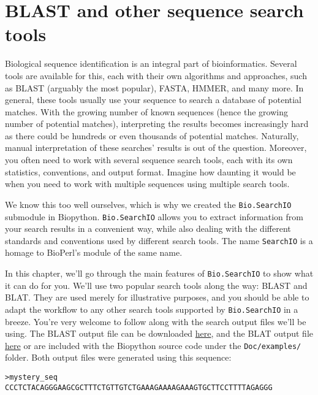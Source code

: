 \chapter{BLAST and other sequence search tools}
\label{chapter:searchio}

Biological sequence identification is an integral part of bioinformatics.
Several tools are available for this, each with their own algorithms and
approaches, such as BLAST (arguably the most popular), FASTA, HMMER, and many
more. In general, these tools usually use your sequence to search a database of
potential matches. With the growing number of known sequences (hence the
growing number of potential matches), interpreting the results becomes
increasingly hard as there could be hundreds or even thousands of potential
matches. Naturally, manual interpretation of these searches' results is out of
the question. Moreover, you often need to work with several sequence search
tools, each with its own statistics, conventions, and output format. Imagine how
daunting it would be when you need to work with multiple sequences using
multiple search tools.

We know this too well ourselves, which is why we created the \verb|Bio.SearchIO|
submodule in Biopython. \verb|Bio.SearchIO| allows you to extract information
from your search results in a convenient way, while also dealing with the
different standards and conventions used by different search tools.
The name \verb|SearchIO| is a homage to BioPerl's module of the same name.

In this chapter, we'll go through the main features of \verb|Bio.SearchIO| to
show what it can do for you. We'll use two popular search tools along the way:
BLAST and BLAT. They are used merely for illustrative purposes, and you should
be able to adapt the workflow to any other search tools supported by
\verb|Bio.SearchIO| in a breeze. You're very welcome to follow along with the
search output files we'll be using. The BLAST output file can be downloaded
\href{https://github.com/biopython/biopython/blob/master/Doc/examples/my_blast.xml}{here},
and the BLAT output file
\href{https://raw.githubusercontent.com/biopython/biopython/master/Doc/examples/my_blat.psl}{here}
or are included with the Biopython source code under the \verb|Doc/examples/|
folder. Both output files were generated using this sequence:

\begin{verbatim}
>mystery_seq
CCCTCTACAGGGAAGCGCTTTCTGTTGTCTGAAAGAAAAGAAAGTGCTTCCTTTTAGAGGG
\end{verbatim}

